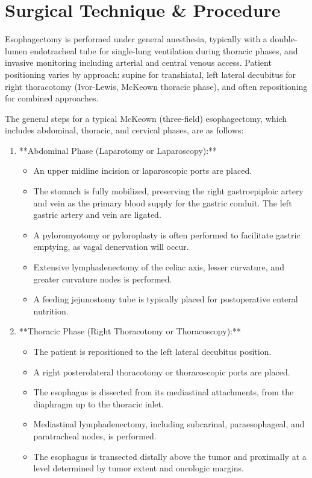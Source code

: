 \section*{Surgical Technique \& Procedure}
Esophagectomy is performed under general anesthesia, typically with a double-lumen endotracheal tube for single-lung ventilation during thoracic phases, and invasive monitoring including arterial and central venous access. Patient positioning varies by approach: supine for transhiatal, left lateral decubitus for right thoracotomy (Ivor-Lewis, McKeown thoracic phase), and often repositioning for combined approaches.

The general steps for a typical McKeown (three-field) esophagectomy, which includes abdominal, thoracic, and cervical phases, are as follows:

\begin{enumerate}
  \item **Abdominal Phase (Laparotomy or Laparoscopy):**
    \begin{itemize}
      \item An upper midline incision or laparoscopic ports are placed.
      \item The stomach is fully mobilized, preserving the right gastroepiploic artery and vein as the primary blood supply for the gastric conduit. The left gastric artery and vein are ligated.
      \item A pyloromyotomy or pyloroplasty is often performed to facilitate gastric emptying, as vagal denervation will occur.
      \item Extensive lymphadenectomy of the celiac axis, lesser curvature, and greater curvature nodes is performed.
      \item A feeding jejunostomy tube is typically placed for postoperative enteral nutrition.
    \end{itemize}

  \item **Thoracic Phase (Right Thoracotomy or Thoracoscopy):**
    \begin{itemize}
      \item The patient is repositioned to the left lateral decubitus position.
      \item A right posterolateral thoracotomy or thoracoscopic ports are placed.
      \item The esophagus is dissected from its mediastinal attachments, from the diaphragm up to the thoracic inlet.
      \item Mediastinal lymphadenectomy, including subcarinal, paraesophageal, and paratracheal nodes, is performed.
      \item The esophagus is transected distally above the tumor and proximally at a level determined by tumor extent and oncologic margins.
    \end{itemize}


\end{enumerate}
